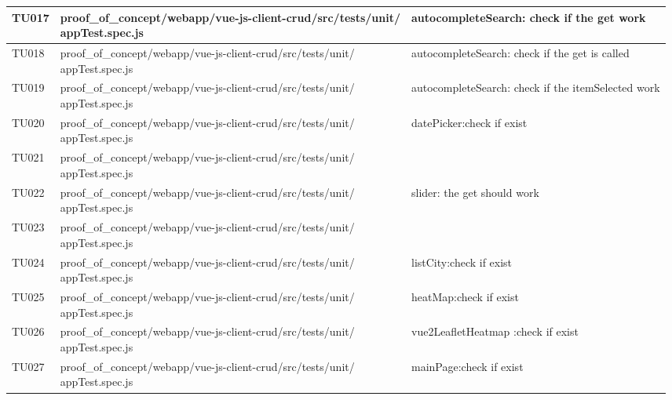 \begin{center}
\begin{longtable}{|p{1.5cm}|p{11.5cm}|p{3.5cm}|}
		\hline
		\centering TU017 & \makecell[c]{proof{\_}of{\_}concept/webapp/vue-js-client-crud/src/tests/unit/\\appTest.spec.js} & {autocompleteSearch: check if the get work}\\
		\hline
		\centering TU018 & \makecell[c]{proof{\_}of{\_}concept/webapp/vue-js-client-crud/src/tests/unit/\\appTest.spec.js} & {autocompleteSearch: check if the get is called}\\
		\hline
		\centering TU019 & \makecell[c]{proof{\_}of{\_}concept/webapp/vue-js-client-crud/src/tests/unit/\\appTest.spec.js} & {autocompleteSearch: check if the itemSelected work}\\
		\hline
		\centering TU020 & \makecell[c]{proof{\_}of{\_}concept/webapp/vue-js-client-crud/src/tests/unit/\\appTest.spec.js} & {datePicker:check if exist}\\
		\hline
		\centering TU021 & \makecell[c]{proof{\_}of{\_}concept/webapp/vue-js-client-crud/src/tests/unit/\\appTest.spec.js} & \makecell[c]{slider:check if exist}\\
		\hline
		\centering TU022 & \makecell[c]{proof{\_}of{\_}concept/webapp/vue-js-client-crud/src/tests/unit/\\appTest.spec.js} & {slider: the get should work}\\
		\hline
		\centering TU023 & \makecell[c]{proof{\_}of{\_}concept/webapp/vue-js-client-crud/src/tests/unit/\\appTest.spec.js} & \makecell[c]{App:check if exist}\\
		\hline
		\centering TU024 & \makecell[c]{proof{\_}of{\_}concept/webapp/vue-js-client-crud/src/tests/unit/\\appTest.spec.js} & {listCity:check if exist}\\
		\hline
		\centering TU025 & \makecell[c]{proof{\_}of{\_}concept/webapp/vue-js-client-crud/src/tests/unit/\\appTest.spec.js} & {heatMap:check if exist}\\
		\hline
		\centering TU026 & \makecell[c]{proof{\_}of{\_}concept/webapp/vue-js-client-crud/src/tests/unit/\\appTest.spec.js} & {vue2LeafletHeatmap :check if exist}\\
		\hline
		\centering TU027 & \makecell[c]{proof{\_}of{\_}concept/webapp/vue-js-client-crud/src/tests/unit/\\appTest.spec.js} & {mainPage:check if exist}\\

\end{longtable}
\end{center}
